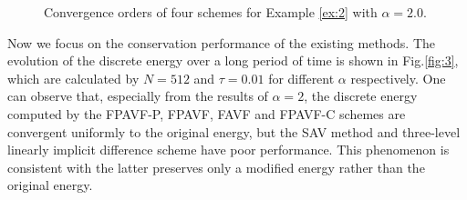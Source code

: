 \documentclass[preprint,compress,3p,10pt,fleqn]{elsarticle}
\numberwithin{equation}{section}
\begin{document}
\begin{figure}[H]
\begin{center}
\caption{Convergence orders of four schemes for Example \ref{ex:2} with $\alpha=2.0$.} \label{fig:2}
\end{center}
\end{figure}

Now we focus on the conservation performance of the existing methods. The evolution of the discrete energy over a long period of time is shown in Fig.\ref{fig:3}, which are calculated by $N=512$ and $\tau=0.01$ for different $\alpha$ respectively. One can observe that, especially from the results of $\alpha=2$, the discrete energy computed by the FPAVF-P, FPAVF, FAVF and FPAVF-C schemes are convergent uniformly to the original energy, but the SAV method \cite{chengConvergenceEnergyconservingScheme2022} and three-level linearly implicit difference scheme \cite{ranLinearlyImplicitConservative2016} have poor performance. This phenomenon is consistent with the latter preserves only a modified energy rather than the original energy.
\end{document}
